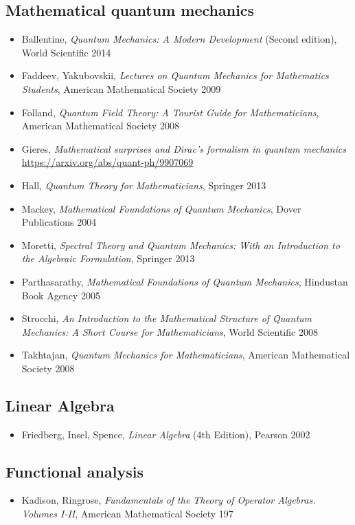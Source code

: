 
\subsection*{Mathematical quantum mechanics}

\begin{itemize}
\item Ballentine, \textit{Quantum Mechanics: A Modern Development} (Second edition), World Scientific 2014
\item Faddeev, Yakubovskii, \textit{Lectures on Quantum Mechanics for Mathematics Students}, American Mathematical Society 2009
\item Folland, \textit{Quantum Field Theory: A Tourist Guide for Mathematicians},  American Mathematical Society 2008
\item Gieres, \textit{Mathematical surprises and Dirac's formalism in quantum mechanics}\\
\url{https://arxiv.org/abs/quant-ph/9907069}
\item Hall, \textit{Quantum Theory for Mathematicians}, Springer 2013
\item Mackey, \textit{Mathematical Foundations of Quantum Mechanics}, Dover Publications 2004
\item Moretti, \textit{Spectral Theory and Quantum Mechanics: With an Introduction to the Algebraic Formulation}, Springer 2013
\item Parthasarathy, \textit{Mathematical Foundations of Quantum Mechanics}, Hindustan Book Agency 2005
\item Strocchi, \textit{An Introduction to the Mathematical Structure of Quantum Mechanics: A Short Course for Mathematicians}, World Scientific 2008
\item Takhtajan, \textit{Quantum Mechanics for Mathematicians}, American Mathematical Society 2008
\end{itemize}

\subsection*{Linear Algebra}

\begin{itemize}
\item Friedberg, Insel, Spence, \textit{Linear Algebra} (4th Edition), Pearson 2002
\end{itemize}


\subsection*{Functional analysis}

\begin{itemize}
\item Kadison, Ringrose, \textit{Fundamentals of the Theory of Operator Algebras. Volumes I-II}, American Mathematical Society 197
\end{itemize}





